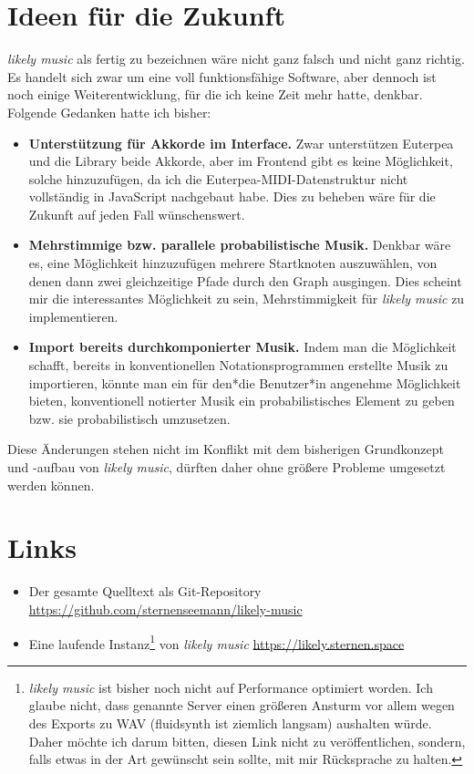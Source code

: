 \documentclass[a4paper,twocolumn]{article}
\begin{document}
\section*{Ideen für die Zukunft}

{\it likely music} als fertig zu bezeichnen wäre nicht ganz falsch und nicht
ganz richtig. Es handelt sich zwar um eine voll funktionsfähige Software, aber
dennoch ist noch einige Weiterentwicklung, für die ich keine Zeit mehr hatte,
denkbar. Folgende Gedanken hatte ich
bisher:

\begin{itemize}
  \item {\bf Unterstützung für Akkorde im Interface.} Zwar unterstützen Euterpea
    und die Library beide Akkorde, aber im Frontend gibt es keine Möglichkeit,
    solche hinzuzufügen, da ich die Euterpea-MIDI-Datenstruktur nicht
    vollständig in JavaScript nachgebaut habe. Dies zu beheben wäre für die
    Zukunft auf jeden Fall wünschenswert.
  \item {\bf Mehrstimmige bzw. parallele probabilistische Musik.} Denkbar wäre
    es, eine Möglichkeit hinzuzufügen mehrere Startknoten auszuwählen, von denen
    dann zwei gleichzeitige Pfade durch den Graph ausgingen. Dies scheint mir
    die interessantes Möglichkeit zu sein, Mehrstimmigkeit für {\it likely music}
    zu implementieren.
  \item {\bf Import bereits durchkomponierter Musik.} Indem man die Möglichkeit
    schafft, bereits in
    konventionellen Notationsprogrammen erstellte Musik zu importieren, könnte man
    ein für den*die Benutzer*in angenehme Möglichkeit bieten, konventionell
    notierter Musik ein probabilistisches Element zu geben bzw. sie
    probabilistisch umzusetzen.
\end{itemize}

Diese Änderungen stehen nicht im Konflikt mit dem bisherigen Grundkonzept und -aufbau von
{\it likely music}, dürften daher ohne größere Probleme umgesetzt werden können.

\section*{Links}

\begin{itemize}
\item Der gesamte Quelltext als Git-Repository \url{https://github.com/sternenseemann/likely-music}
\item Eine laufende Instanz\footnote{{\it likely music} ist bisher noch nicht
  auf Performance optimiert worden. Ich glaube nicht, dass genannte Server einen
    größeren Ansturm vor allem wegen des Exports zu WAV (fluidsynth
    \cite{fluidsynth} ist ziemlich
    langsam) aushalten würde. Daher möchte ich darum bitten, diesen Link nicht
    zu veröffentlichen, sondern, falls etwas in der Art gewünscht sein sollte,
    mit mir Rücksprache zu halten.} von {\it likely music} \url{https://likely.sternen.space}
\end{itemize}
\end{document}
